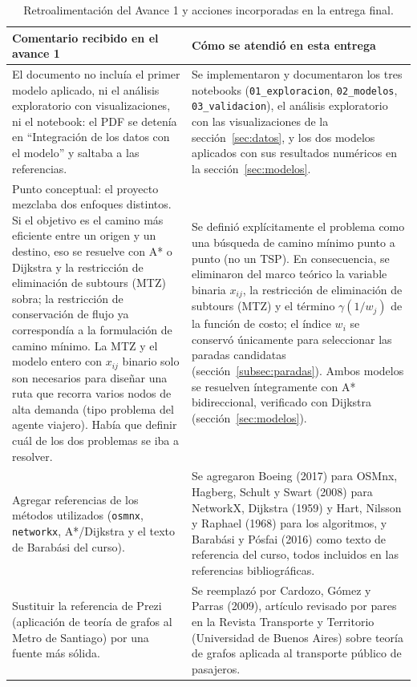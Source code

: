 \documentclass[11pt]{article}
\numberwithin{equation}{section}
\begin{document}
\begin{longtable}{p{} p{}}
\caption{Retroalimentación del Avance 1 y acciones incorporadas en la entrega final.}\label{tab:retroalimentacion}\\
\toprule
\textbf{Comentario recibido en el avance 1} & \textbf{Cómo se atendió en esta entrega} \\
\midrule
\endhead
El documento no incluía el primer modelo aplicado, ni el análisis exploratorio con visualizaciones, ni el notebook: el PDF se detenía en ``Integración de los datos con el modelo'' y saltaba a las referencias.
&
Se implementaron y documentaron los tres notebooks (\texttt{01\_exploracion}, \texttt{02\_modelos}, \texttt{03\_validacion}), el análisis exploratorio con las visualizaciones de la sección~\ref{sec:datos}, y los dos modelos aplicados con sus resultados numéricos en la sección~\ref{sec:modelos}. \\
\addlinespace
Punto conceptual: el proyecto mezclaba dos enfoques distintos. Si el objetivo es el camino más eficiente entre un origen y un destino, eso se resuelve con A* o Dijkstra y la restricción de eliminación de subtours (MTZ) sobra; la restricción de conservación de flujo ya correspondía a la formulación de camino mínimo. La MTZ y el modelo entero con $x_{ij}$ binario solo son necesarios para diseñar una ruta que recorra varios nodos de alta demanda (tipo problema del agente viajero). Había que definir cuál de los dos problemas se iba a resolver.
&
Se definió explícitamente el problema como una búsqueda de camino mínimo punto a punto (no un TSP). En consecuencia, se eliminaron del marco teórico la variable binaria $x_{ij}$, la restricción de eliminación de subtours (MTZ) y el término $\gamma(1/w_j)$ de la función de costo; el índice $w_i$ se conservó únicamente para seleccionar las paradas candidatas (sección~\ref{subsec:paradas}). Ambos modelos se resuelven íntegramente con A* bidireccional, verificado con Dijkstra (sección~\ref{sec:modelos}). \\
\addlinespace
Agregar referencias de los métodos utilizados (\texttt{osmnx}, \texttt{networkx}, A*/Dijkstra y el texto de Barabási del curso).
&
Se agregaron Boeing (2017) para OSMnx, Hagberg, Schult y Swart (2008) para NetworkX, Dijkstra (1959) y Hart, Nilsson y Raphael (1968) para los algoritmos, y Barabási y Pósfai (2016) como texto de referencia del curso, todos incluidos en las referencias bibliográficas. \\
\addlinespace
Sustituir la referencia de Prezi (aplicación de teoría de grafos al Metro de Santiago) por una fuente más sólida.
&
Se reemplazó por Cardozo, Gómez y Parras (2009), artículo revisado por pares en la Revista Transporte y Territorio (Universidad de Buenos Aires) sobre teoría de grafos aplicada al transporte público de pasajeros. \\
\bottomrule
\end{longtable}
\end{document}
